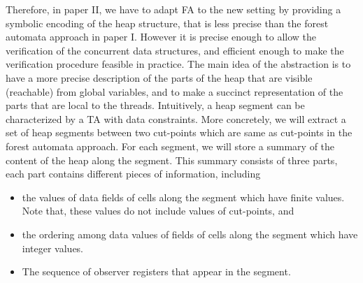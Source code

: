 Therefore, in paper II, we have to adapt FA to the new setting by providing a symbolic encoding of the heap structure, that is less precise than the forest automata approach in paper I. However it is precise enough to allow the verification of the concurrent data structures, and efficient enough to make the verification procedure feasible in practice.
The main idea of the abstraction is to have a more precise description of the parts of the heap that are visible (reachable) from global variables, and to make a succinct representation of the parts that are local to the threads. Intuitively, a heap segment can be characterized by a TA with data constraints. More concretely, we will extract a set of heap segments between two cut-points which are same as cut-points in the forest automata approach. For each segment, we will store a summary of the content of the heap along the segment. This summary consists of three parts, each part contains different pieces of information, including 
\begin{itemize}
\item the values of data fields of cells along the segment which have finite values. Note that, these values do not include values of cut-points, and
\item the ordering among data values of fields of cells along the segment which have integer values. 
\item The sequence of observer registers that appear in the segment. 
\end{itemize}
	

